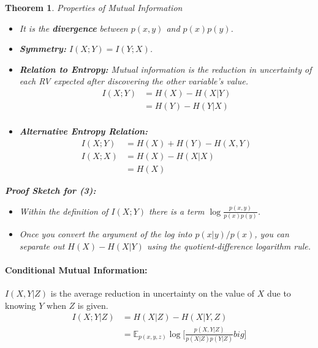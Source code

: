 \documentclass[a4paper,12pt]{report}
\newtheorem{theorem}{Theorem}
\begin{document}
\begin{theorem}{Properties of Mutual Information}
\begin{itemize}
\item It is the \textbf{divergence} between $p(x,y)$ and $p(x)p(y)$.
\item \textbf{Symmetry: } $I(X; Y) = I(Y; X)$.
\item \textbf{Relation to Entropy: } Mutual information is the \textit{reduction
in uncertainty} of each RV expected after discovering the other variable's
value. 
	\begin{align}
		\label{eqn:mi_entropy}
		I(X; Y) &= H(X) - H(X | Y) \\ 
				&= H(Y) - H(Y | X) \\
	\end{align}

\item \textbf{Alternative Entropy Relation: }
	\begin{align}
		\label{eqn:mi_entropy_2}
		I(X; Y) &= H(X) + H(Y) - H(X, Y) \\ 
		I(X; X)	&= H(X) - H(X | X) \\ 
				&= H(X)
	\end{align}

\end{itemize}

\textbf{Proof Sketch for (3): } 
\begin{itemize}
\item Within the definition of $I(X; Y)$ there is a term $\log \frac{p(x,y)}{p(x)p(y)}$. 
\item Once you convert the argument of the log into $p(x | y) / p(x)$, you can separate out $H(X) - H(X | Y)$ using the
quotient-difference logarithm rule.
\end{itemize}
\end{theorem}


\paragraph{Conditional Mutual Information: } $I(X, Y | Z)$ is the average
reduction in uncertainty on the value of $X$ due to knowing $Y$ when $Z$ is
given. 
\begin{align}
	\label{eqn:cond_MI}
	I(X; Y | Z) &= H(X | Z) - H(X | Y, Z) \\ 
				&= \mathbb E_{p(x,y,z)}	\log \big[ \frac{p(X, Y | Z)}{p(X|Z)
				p(Y|Z)} big] \\
\end{align}
\end{document}
